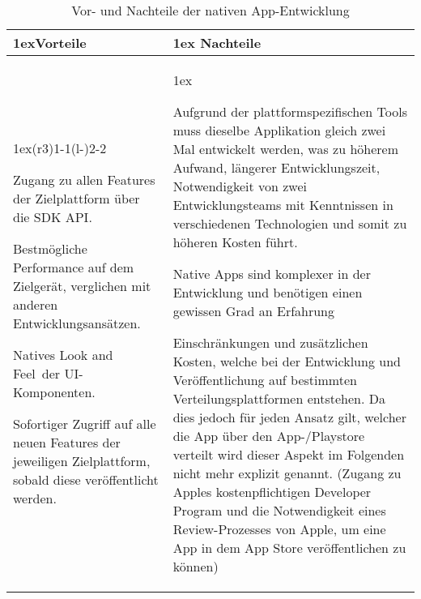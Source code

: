 \makeatletter %
\setlength{\@fptop}{0pt}
\makeatother
\begin{table}[h]
	\begin{tabularx}{\linewidth}{>{\parskip1ex}X@{\kern4\tabcolsep}>{\parskip1ex}X}
		\toprule
		\hfil\bfseries Vorteile
		&
		\hfil\bfseries Nachteile
		\\\cmidrule(r{3\tabcolsep}){1-1}\cmidrule(l{-\tabcolsep}){2-2}
		
		Zugang zu allen Features der Zielplattform über die \ac{SDK} \ac{API}.\par
		Bestmögliche Performance auf dem Zielgerät, verglichen mit anderen Entwicklungsansätzen.\par
		Natives \glqq Look and Feel\grqq\  der \ac{UI}-Komponenten.\par
		Sofortiger Zugriff auf alle neuen Features der jeweiligen Zielplattform, sobald diese veröffentlicht werden.\par
		
		&
		
		Aufgrund der plattformspezifischen Tools muss dieselbe Applikation gleich zwei Mal entwickelt werden, was zu höherem Aufwand, längerer Entwicklungszeit, Notwendigkeit von zwei Entwicklungsteams mit Kenntnissen in verschiedenen Technologien und somit zu höheren Kosten führt.\par
		Native Apps sind komplexer in der Entwicklung und benötigen einen gewissen Grad an Erfahrung\cite{xanthopoulos_compare_cross_plattform}\par
		Einschränkungen und zusätzlichen Kosten, welche bei der Entwicklung und Veröffentlichung auf bestimmten Verteilungsplattformen entstehen. Da dies jedoch für jeden Ansatz gilt, welcher die App über den App-/Playstore verteilt wird dieser Aspekt im Folgenden nicht mehr explizit genannt.
		(Zugang zu Apples kostenpflichtigen Developer Program\cite{apple_member} und die Notwendigkeit eines Review-Prozesses von Apple, um eine App in dem App Store veröffentlichen zu können\cite{apple_submit})\par
		\\\bottomrule
	\end{tabularx}
	\caption{Vor- und Nachteile der nativen App-Entwicklung}
\end{table}

\clearpage
